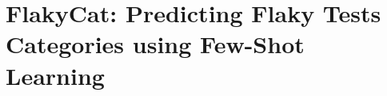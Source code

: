 \chapter{FlakyCat: Predicting Flaky Tests Categories using Few-Shot Learning}
\label{chap:flakycat}

\chapterPage{
}









